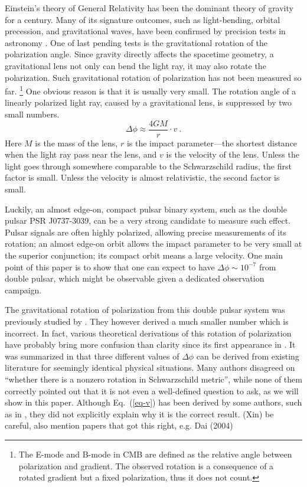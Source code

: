 \documentclass[aps,showpacs,twocolumn,floats,prd,superscriptaddress,nofootinbib]{revtex4}
\begin{document}
Einstein's theory of General Relativity has been the dominant theory of gravity for a century. 
Many of its signature outcomes, such as light-bending, orbital precession, and gravitational waves, have been confirmed by precision tests in astronomy \cite{DysEdd20,KraSta97,WeiTay04,Abb16}. 
One of last pending tests is the gravitational rotation of the polarization angle. 
Since gravity directly affects the spacetime geometry, a gravitational lens not only can bend the light ray, it may also rotate the polarization.
Such gravitational rotation of polarization has not been measured so far.
\footnote{The E-mode and B-mode in CMB are defined as the relative angle between polarization and gradient. 
The observed rotation is a consequence of a rotated gradient but a fixed polarization, thus it does not count.} 
One obvious reason is that it is usually very small. 
The rotation angle of a linearly polarized light ray, caused by a gravitational lens, is suppressed by two small numbers.
\begin{equation}
\Delta\phi \approx \frac{4GM}{r} \cdot v~.
\label{eq-v}
\end{equation}
Here $M$ is the mass of the lens, $r$ is the impact parameter---the shortest distance when the light ray pass near the lens, and $v$ is the velocity of the lens.  
Unless the light goes through somewhere comparable to the Schwarzschild radius, the first factor is small. 
Unless the velocity is almost relativistic, the second factor is small. 

Luckily, an almost edge-on, compact pulsar binary system, such as the double pulsar PSR J0737-3039, can be a very strong candidate to measure such effect. 
Pulsar signals are often highly polarized, allowing precise measurements of its rotation; 
an almost edge-on orbit allows the impact parameter to be very small at the superior conjunction; 
its compact orbit means a large velocity. 
One main point of this paper is to show that one can expect to have $\Delta\phi\sim 10^{-7}$ from double pulsar, which might be observable given a dedicated observation campaign.

The gravitational rotation of polarization from this double pulsar system was previously studied by \cite{RugTar06}. 
They however derived a much smaller number which is incorrect. 
In fact, various theoretical derivations of this rotation of polarization have probably bring more confusion  %
than clarity since its first appearance in \cite{Skr57}.
{\color{blue} It was summarized in \cite{BroDem11} that three different values of $\Delta\phi$ can be derived from existing literature for seemingly identical physical situations.
Many authors disagreed on ``whether there is a nonzero rotation in Schwarzschild metric'', while none of them correctly pointed out that it is not even a well-defined question to ask, as we will show in this paper.
Although Eq.~(\ref{eq-v}) has been derived by some authors, such as in \cite{KopMas01}, they did not explicitly explain why it is the correct result. }
{\color{red} (Xin) be careful, also mention papers that got this right, e.g. Dai (2004) }
\end{document}
